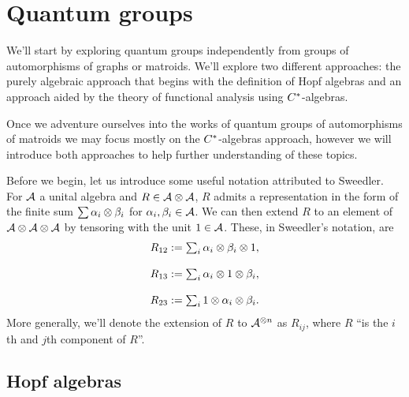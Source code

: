\chapter{Quantum groups}

We'll start by exploring quantum groups independently from groups of automorphisms of graphs or matroids. We'll explore two different approaches: the purely algebraic approach that begins with the definition of Hopf algebras and an approach aided by the theory of functional analysis using $C^{*}$-algebras.

Once we adventure ourselves into the works of quantum groups of automorphisms of matroids we may focus mostly on the $C^{*}$-algebras approach, however we will introduce both approaches to help further understanding of these topics.

Before we begin, let us introduce some useful notation attributed to Sweedler. For $\mathcal{A}$ a unital algebra and $R \in \mathcal{A}\otimes\mathcal{A}$, $R$ admits a representation in the form of the finite sum $\sum\alpha_{i}\otimes\beta_{i}$ for $\alpha_{i},\beta_{i}\in\mathcal{A}$. We can then extend $R$ to an element of $\mathcal{A}\otimes\mathcal{A}\otimes\mathcal{A}$ by tensoring with the unit $1 \in \mathcal{A}$. These, in Sweedler's notation, are
\begin{equation}
\begin{array}{c}
    R_{12} := \sum_{i}\alpha_{i}\otimes\beta_{i}\otimes1,   \\\\
    R_{13} := \sum_{i}\alpha_{i}\otimes1\otimes\beta_{i},   \\\\
    R_{23} := \sum_{i}1\otimes\alpha_{i}\otimes\beta_{i}.
\end{array}
\end{equation}
More generally, we'll denote the extension of $R$ to $\mathcal{A}^{\otimes n}$ as $R_{ij}$, where $R$ ``is the $i$th and $j$th component of $R$''.

\section{Hopf algebras}

